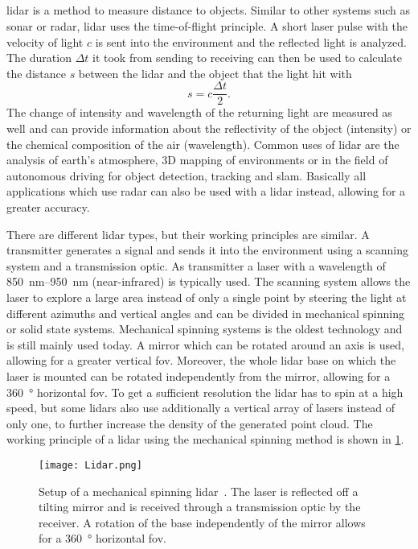 \subsection{}
\label{ssec:lidar}
\gls{lidar} is a method to measure distance to objects.
Similar to other systems such as \gls{sonar} or \gls{radar}, \gls{lidar} uses the time-of-flight principle.
A short laser pulse with the velocity of light $c$ is sent into the environment and the reflected light is analyzed.
The duration $\Delta t$ it took from sending to receiving can then be used to calculate the distance $s$ between the \gls{lidar} and the object that the light hit with
\begin{equation}
    s = c\frac{\Delta t}{2}.
\end{equation}
The change of intensity and wavelength of the returning light are measured as well and can provide information about the reflectivity of the object (intensity) or the chemical composition of the air (wavelength).
Common uses of \gls{lidar} are the analysis of earth's atmosphere, 3D mapping of environments or in the field of autonomous driving for object detection, tracking and \gls{slam}.
Basically all applications which use \gls{radar} can also be used with a \gls{lidar} instead, allowing for a greater accuracy.\par
There are different \gls{lidar} types, but their working principles are similar.
A transmitter generates a signal and sends it into the environment using a scanning system and a transmission optic.
As transmitter a laser with a wavelength of \SIrange{850}{950}{\nano\metre} (near-infrared) is typically used.
The scanning system allows the laser to explore a large area instead of only a single point by steering the light at different azimuths and vertical angles and can be divided in mechanical spinning or solid state systems.
Mechanical spinning systems is the oldest technology and is still mainly used today.
A mirror which can be rotated around an axis is used, allowing for a greater vertical \gls{fov}.
Moreover, the whole \gls{lidar} base on which the laser is mounted can be rotated independently from the mirror, allowing for a \SI{360}{\degree} horizontal \gls{fov}.
To get a sufficient resolution the \gls{lidar} has to spin at a high speed, but some \glspl{lidar} also use additionally a vertical array of lasers instead of only one, to further increase the density of the generated point cloud.
The working principle of a \gls{lidar} using the mechanical spinning method is shown in \cref{fig:lidar}.
\begin{figure}[htb]
    \centering
    \texttt{[image: Lidar.png]}
    \caption[Setup of a mechanical spinning \acrshort{lidar}]{Setup of a mechanical spinning \acrshort{lidar}~\cite{Li2020}. The laser is reflected off a tilting mirror and is received through a transmission optic by the receiver. A rotation of the base independently of the mirror allows for a \SI{360}{\degree} horizontal \gls{fov}.}
    \label{fig:lidar}
\end{figure}
